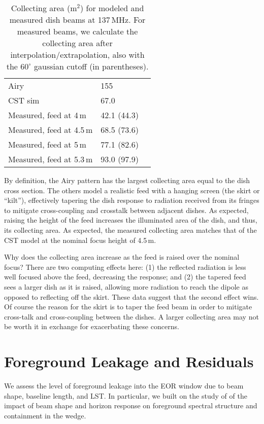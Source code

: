 \documentclass{emulateapj}
\begin{document}
 \begin{table}[h]
 \caption{ \label{table:collectingareatable}Collecting area (m$^2$) for modeled and measured dish beams at 137\,MHz. For measured beams, we calculate the collecting area after interpolation/extrapolation, also with the $60^\circ$ gaussian cutoff (in parentheses).}
\begin{tabular}{| l | l | l |}
\hline
  Airy & 155\,  \\
  CST sim & 67.0\,  \\
  \hline
  Measured, feed at 4\,m & 42.1 (44.3) \\
  Measured, feed at 4.5\,m & 68.5 (73.6) \\ 
  Measured, feed at 5\,m & 77.1 (82.6) \\
  Measured, feed at 5.3\,m & 93.0 (97.9)\\
  \hline
\end{tabular}
\end{table}

By definition, the Airy pattern has the largest collecting area equal to the dish cross section. The others model a realistic feed with a hanging screen (the skirt or ``kilt''), effectively tapering the dish response to radiation received from its fringes to mitigate cross-coupling and crosstalk between adjacent dishes. As expected, raising the height of the feed increases the illuminated area of the dish, and thus, its collecting area. As expected, the measured collecting area matches that of the CST model at the nominal focus height of 4.5\,m.

Why does the collecting area increase as the feed is raised over the nominal focus? There are two computing effects here: (1) the reflected radiation is less well focused above the feed, decreasing the response; and (2) the tapered feed sees a larger dish as it is raised, allowing more radiation to reach the dipole as opposed to reflecting off the skirt. These data suggest that the second effect wins. Of course the reason for the skirt is to taper the feed beam in order to mitigate cross-talk and cross-coupling between the dishes. A larger collecting area may not be worth it in exchange for exacerbating these concerns.

\section{Foreground Leakage and Residuals}
\label{sec:foregroundleakage}

We assess the level of foreground leakage into the EOR window due to beam shape, baseline length, and LST. In particular, we built on the study of \citet{nithya15} of the impact of beam shape and horizon response on foreground spectral structure and containment in the wedge.
\end{document}
